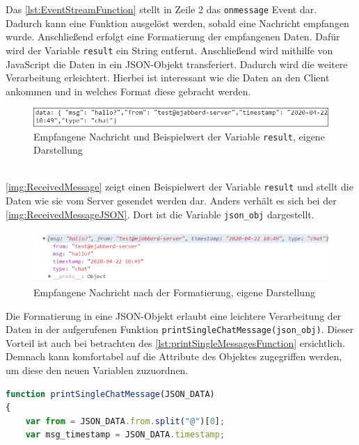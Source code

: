 \documentclass[a4paper,titlepage,halfparskip,12pt]{scrreprt}
\begin{document}
\begin{onehalfspacing}
Das \autoref{lst:EventStreamFunction} stellt in Zeile 2 das \texttt{onmessage} Event dar. Dadurch kann eine Funktion ausgelöst werden, sobald eine Nachricht empfangen wurde. Anschließend erfolgt eine Formatierung der empfangenen Daten. Dafür wird der Variable \texttt{result} ein String entfernt. Anschließend wird mithilfe von JavaScript die Daten in ein JSON-Objekt transferiert. Dadurch wird die weitere Verarbeitung erleichtert. Hierbei ist interessant wie die Daten an den Client ankommen und in welches Format diese gebracht werden.
\begin{figure}[h]
	\centering
	\includegraphics[scale=1.2]{images/GochatAusgabeEmpfangenerNachrichtBearbeitet}
	\caption{Empfangene Nachricht und Beispielwert der Variable \texttt{result}, eigene Darstellung}
	\label{img:ReceivedMessage}
\end{figure}\\
\autoref{img:ReceivedMessage} zeigt einen Beispielwert der Variable \texttt{result} und stellt die Daten wie sie vom Server gesendet werden dar. Anders verhält es sich bei der \autoref{img:ReceivedMessageJSON}. Dort ist die Variable \texttt{json\_obj} dargestellt.
\begin{figure}[h]
	\centering
	\includegraphics[width=\textwidth]{images/GochatAusgabeEmpfangenerNachrichtJSONformat}
	\caption{Empfangene Nachricht nach der Formatierung, eigene Darstellung}
	\label{img:ReceivedMessageJSON}
\end{figure}
Die Formatierung in eine JSON-Objekt erlaubt eine leichtere Verarbeitung der Daten in der aufgerufenen Funktion \texttt{printSingleChatMessage(json\_obj)}. %
Dieser Vorteil ist auch bei betrachten des \autoref{lst:printSingleMessagesFunction} ersichtlich. Demnach kann komfortabel auf die Attribute des Objektes zugegriffen werden, um diese den neuen Variablen zuzuordnen. 
\begin{lstlisting}[language=Javascript,caption=Funktion und Datenverarbeitung des JSON-Objektes ,label={lst:printSingleMessagesFunction}]
function printSingleChatMessage(JSON_DATA)
{
	var from = JSON_DATA.from.split("@")[0];
	var msg_timestamp = JSON_DATA.timestamp;

\end{lstlisting}
\end{onehalfspacing}
\end{document}
